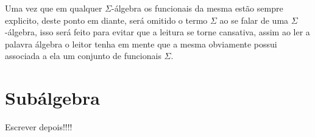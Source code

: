 \begin{nota}
  Uma vez que em qualquer $\Sigma$-álgebra os funcionais da mesma estão sempre explicito, deste ponto em diante, será omitido o termo $\Sigma$ ao se falar de uma $\Sigma$-álgebra, isso será feito para evitar que a leitura se torne cansativa, assim ao ler a palavra álgebra o leitor tenha em mente que a mesma obviamente possui associada a ela um conjunto de funcionais $\Sigma$.
\end{nota}

\section{Subálgebra}\label{sec:SubAlgebra}

{\color{red} Escrever depois!!!!}
